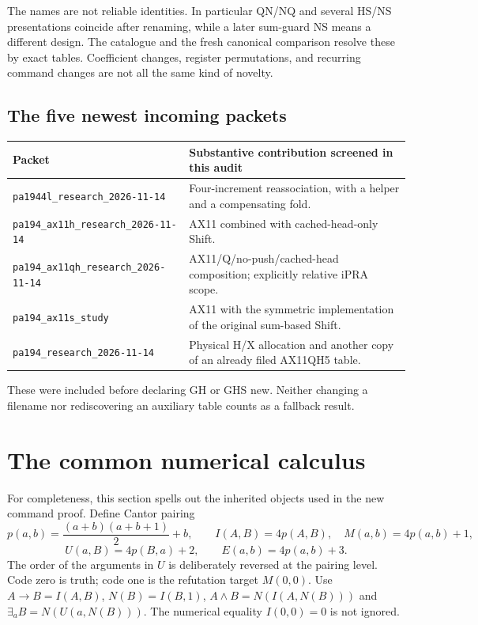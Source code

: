 \documentclass[11pt,letterpaper]{article}
\newcommand{\file}[1]{\texttt{\nolinkurl{#1}}}
\begin{document}
The names are not reliable identities. In particular QN/NQ and several
HS/NS presentations coincide after renaming, while a later sum-guard NS
means a different design. The catalogue and the fresh canonical comparison
resolve these by exact tables. Coefficient changes, register permutations,
and recurring command changes are not all the same kind of novelty.

\subsection{The five newest incoming packets}

\begin{center}\small
\begin{tabularx}{\linewidth}{@{}lX@{}}
\toprule
Packet & Substantive contribution screened in this audit\\
\midrule
\file{pa1944l_research_2026-11-14} & Four-increment reassociation, with a helper and a compensating fold.\\
\file{pa194_ax11h_research_2026-11-14} & AX11 combined with cached-head-only Shift.\\
\file{pa194_ax11qh_research_2026-11-14} & AX11/Q/no-push/cached-head composition; explicitly relative iPRA scope.\\
\file{pa194_ax11s_study} & AX11 with the symmetric implementation of the original sum-based Shift.\\
\file{pa194_research_2026-11-14} & Physical H/X allocation and another copy of an already filed AX11QH5 table.\\
\bottomrule
\end{tabularx}
\end{center}

These were included before declaring GH or GHS new. Neither changing a
filename nor rediscovering an auxiliary table counts as a fallback result.

\section{The common numerical calculus}
\label{sec:calculus}

For completeness, this section spells out the inherited objects used in
the new command proof. Define Cantor pairing
\[
 p(a,b)=\frac{(a+b)(a+b+1)}2+b,
 \qquad I(A,B)=4p(A,B),\quad M(a,b)=4p(a,b)+1,
\]
\[
 U(a,B)=4p(B,a)+2,\qquad E(a,b)=4p(a,b)+3.
\]
The order of the arguments in $U$ is deliberately reversed at the pairing
level. Code zero is truth; code one is the refutation target $M(0,0)$.
Use $A\to B=I(A,B)$, $N(B)=I(B,1)$,
$A\wedge B=N(I(A,N(B)))$ and $\exists_a B=N(U(a,N(B)))$.
The numerical equality $I(0,0)=0$ is not ignored.
\end{document}
